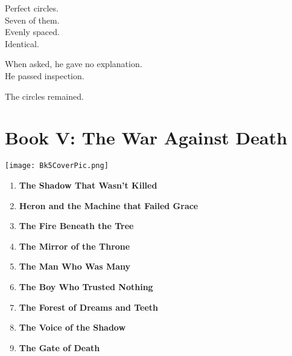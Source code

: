 \documentclass[12pt]{article}
\begin{document}
Perfect circles.\\
Seven of them.\\
Evenly spaced.\\
Identical.

When asked, he gave no explanation.\\
He passed inspection.

The circles remained.

\newpage

\section{Book V: The War Against Death}

\vspace{1em}

\begin{center}
    \texttt{[image: Bk5CoverPic.png]}
\end{center}

\vspace{1em}

\begin{enumerate}
    \item \textbf{The Shadow That Wasn’t Killed} 

    \vspace{1pt}

    \item \textbf{Heron and the Machine that Failed Grace} 

    \vspace{1pt}

    \item \textbf{The Fire Beneath the Tree} 

    \vspace{1pt}

    \item \textbf{The Mirror of the Throne} 

    \vspace{1pt}

    \item \textbf{The Man Who Was Many} 

    \vspace{1pt}

    \item \textbf{The Boy Who Trusted Nothing}

    \vspace{1pt}

    \item \textbf{The Forest of Dreams and Teeth} 

    \vspace{1pt}

    \item \textbf{The Voice of the Shadow}

    \vspace{1pt}

    \item \textbf{The Gate of Death}

\end{enumerate}
\end{document}
